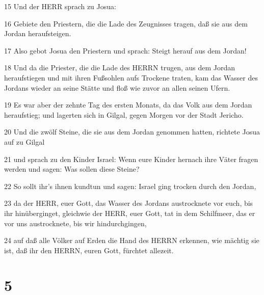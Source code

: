 \par 15 Und der HERR sprach zu Josua:
\par 16 Gebiete den Priestern, die die Lade des Zeugnisses tragen, daß sie aus dem Jordan heraufsteigen.
\par 17 Also gebot Josua den Priestern und sprach: Steigt herauf aus dem Jordan!
\par 18 Und da die Priester, die die Lade des HERRN trugen, aus dem Jordan heraufstiegen und mit ihren Fußsohlen aufs Trockene traten, kam das Wasser des Jordans wieder an seine Stätte und floß wie zuvor an allen seinen Ufern.
\par 19 Es war aber der zehnte Tag des ersten Monats, da das Volk aus dem Jordan heraufstieg; und lagerten sich in Gilgal, gegen Morgen vor der Stadt Jericho.
\par 20 Und die zwölf Steine, die sie aus dem Jordan genommen hatten, richtete Josua auf zu Gilgal
\par 21 und sprach zu den Kinder Israel: Wenn eure Kinder hernach ihre Väter fragen werden und sagen: Was sollen diese Steine?
\par 22 So sollt ihr's ihnen kundtun und sagen: Israel ging trocken durch den Jordan,
\par 23 da der HERR, euer Gott, das Wasser des Jordans austrocknete vor euch, bis ihr hinüberginget, gleichwie der HERR, euer Gott, tat in dem Schilfmeer, das er vor uns austrocknete, bis wir hindurchgingen,
\par 24 auf daß alle Völker auf Erden die Hand des HERRN erkennen, wie mächtig sie ist, daß ihr den HERRN, euren Gott, fürchtet allezeit.

\chapter{5}

